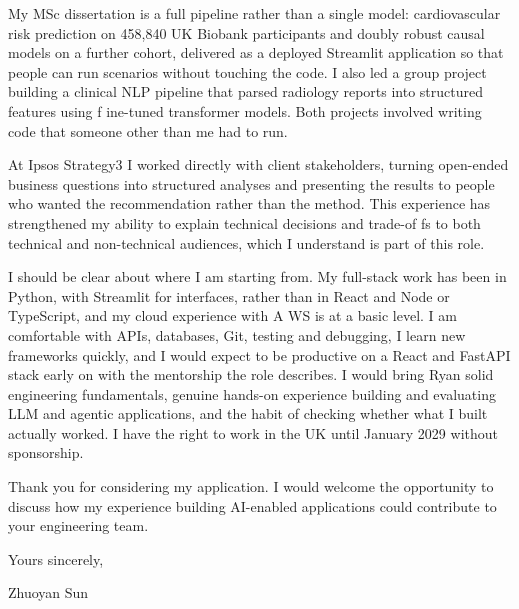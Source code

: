\documentclass[letterpaper,11pt]{article}
\begin{document}
My MSc dissertation is a full pipeline rather than a single model: cardiovascular risk prediction on 458,840 UK Biobank participants and doubly robust causal models on a further cohort, delivered as a deployed Streamlit application so that people can run scenarios without touching the code. I also led a group project building a clinical NLP pipeline that parsed radiology reports into structured features using f\kern0pt ine-tuned transformer models. Both projects involved writing code that someone other than me had to run.

At Ipsos Strategy3 I worked directly with client stakeholders, turning open-ended business questions into structured analyses and presenting the results to people who wanted the recommendation rather than the method. This experience has strengthened my ability to explain technical decisions and trade-of\kern0pt fs to both technical and non-technical audiences, which I understand is part of this role.

I should be clear about where I am starting from. My full-stack work has been in Python, with Streamlit for interfaces, rather than in React and Node or TypeScript, and my cloud experience with A\kern0pt WS is at a basic level. I am comfortable with APIs, databases, Git, testing and debugging, I learn new frameworks quickly, and I would expect to be productive on a React and FastAPI stack early on with the mentorship the role describes. I would bring Ryan solid engineering fundamentals, genuine hands-on experience building and evaluating LLM and agentic applications, and the habit of checking whether what I built actually worked. I have the right to work in the UK until January 2029 without sponsorship.

Thank you for considering my application. I would welcome the opportunity to discuss how my experience building AI-enabled applications could contribute to your engineering team.

\vspace{2pt}
Yours sincerely,

\vspace{8pt}
Zhuoyan Sun
\end{document}
